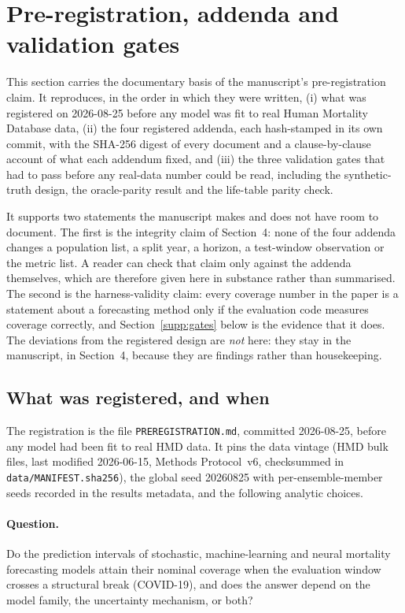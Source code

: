 \section{Pre-registration, addenda and validation gates}
\label{supp:prereg}

This section carries the documentary basis of the manuscript's
pre-registration claim. It reproduces, in the order in which they were
written, (i) what was registered on 2026-08-25 before any model was fit to
real Human Mortality Database data, (ii) the four registered addenda, each
hash-stamped in its own commit, with the SHA-256 digest of every document and
a clause-by-clause account of what each addendum fixed, and (iii) the three
validation gates that had to pass before any real-data number could be read,
including the synthetic-truth design, the  oracle-parity result
and the life-table parity check.

It supports two statements the manuscript makes and does not have room to
document. The first is the integrity claim of Section~4: none of the four
addenda changes a population list, a split year, a horizon, a test-window
observation or the metric list. A reader can check that claim only against
the addenda themselves, which are therefore given here in substance rather
than summarised. The second is the harness-validity claim: every coverage
number in the paper is a statement about a forecasting method only if the
evaluation code measures coverage correctly, and Section~\ref{supp:gates}
below is the evidence that it does. The deviations from the registered design
are \emph{not} here: they stay in the manuscript, in Section~4, because they
are findings rather than housekeeping.

\subsection{What was registered, and when}
\label{supp:prereg-what}

The registration is the file \texttt{PREREGISTRATION.md}, committed
2026-08-25, before any model had been fit to real HMD data. It pins the data
vintage (HMD bulk files, last modified 2026-06-15, Methods Protocol~v6,
checksummed in \texttt{data/MANIFEST.sha256}), the global seed 20260825 with
per-ensemble-member seeds recorded in the results metadata, and the following
analytic choices.

\paragraph{Question.} Do the prediction intervals of stochastic,
machine-learning and neural mortality forecasting models attain their nominal
coverage when the evaluation window crosses a structural break (COVID-19),
and does the answer depend on the model family, the uncertainty mechanism, or
both?


